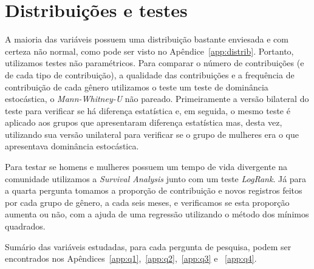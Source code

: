 \section{Distribuições e testes}

A maioria das variáveis possuem uma distribuição bastante enviesada e com certeza não normal, como pode ser visto no Apêndice~\ref{app:distrib}. Portanto, utilizamos testes não paramétricos. Para comparar o número de contribuições (e de cada tipo de contribuição), a qualidade das contribuições e a frequência de contribuição de cada gênero utilizamos o teste um teste de dominância estocástica, o \emph{Mann-Whitney-U} não pareado. Primeiramente a versão bilateral do teste para verificar se há diferença estatística e, em seguida, o mesmo teste é aplicado aos grupos que apresentaram diferença estatística mas, desta vez, utilizando sua versão unilateral para verificar se o grupo de mulheres era o que apresentava dominância estocástica.

Para testar se homens e mulheres possuem um tempo de vida divergente na comunidade utilizamos a \textit{Survival Analysis} junto com um teste \emph{LogRank}. Já para a quarta pergunta tomamos a proporção de contribuição e novos registros feitos por cada grupo de gênero, a cada seis meses, e verificamos se esta proporção aumenta ou não, com a ajuda de uma regressão utilizando o método dos mínimos quadrados.

Sumário das variáveis estudadas, para cada pergunta de pesquisa, podem ser encontrados nos Apêndices~\ref{app:q1},~\ref{app:q2},~\ref{app:q3} e ~\ref{app:q4}.


